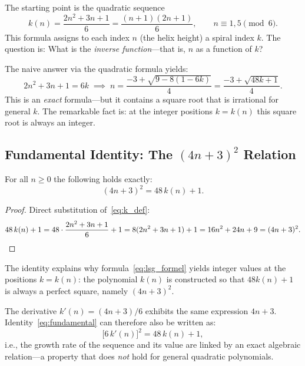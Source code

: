 The starting point is the quadratic sequence
\begin{equation}\label{eq:k_def}
  k(n) = \frac{2n^2 + 3n + 1}{6} = \frac{(n+1)(2n+1)}{6},
  \qquad n \equiv 1, 5 \pmod{6}.
\end{equation}
This formula assigns to each index $n$ (the helix height) a
spiral index $k$. The question is: What is the
\emph{inverse function}---that is, $n$ as a function of $k$?

The naive answer via the quadratic formula yields:
\begin{equation}\label{eq:lsg_formel}
  2n^2 + 3n + 1 = 6k
  \;\implies\;
  n = \frac{-3 + \sqrt{9 - 8(1-6k)}}{4}
    = \frac{-3 + \sqrt{48k + 1}}{4}.
\end{equation}
This is an \emph{exact} formula---but it contains a square root
that is irrational for general $k$. The remarkable fact is:
at the integer positions $k = k(n)$ this square root is always
an integer.

\subsection{Fundamental Identity: The \texorpdfstring{$(4n+3)^2$}{(4n+3)^2} Relation}
\label{subsec:fundamentale_identitaet}

\begin{satz}\label{satz:fundamental}
For all $n \geq 0$ the following holds exactly:
\begin{equation}\label{eq:fundamental}
  \boxed{(4n+3)^2 = 48\,k(n) + 1.}
\end{equation}
\end{satz}

\begin{proof}
Direct substitution of~\eqref{eq:k_def}:
\[
  48\,k(n) + 1
  = 48\cdot\frac{2n^2 + 3n + 1}{6} + 1
  = 8(2n^2 + 3n + 1) + 1
  = 16n^2 + 24n + 9
  = (4n+3)^2. \qedhere
\]
\end{proof}

\noindent
The identity explains why formula~\eqref{eq:lsg_formel}
yields integer values at the positions $k = k(n)$: the polynomial $k(n)$
is constructed so that $48k(n)+1$ is always a perfect square,
namely $(4n+3)^2$.

\begin{bemerkung}
The derivative $k'(n) = (4n+3)/6$ exhibits the same expression $4n+3$.
Identity~\eqref{eq:fundamental} can therefore also be written as:
\[
  \bigl[6\,k'(n)\bigr]^2 = 48\,k(n) + 1,
\]
i.e., the growth rate of the sequence and its value are linked by an exact
algebraic relation---a property that does \emph{not} hold for general
quadratic polynomials.
\end{bemerkung}


